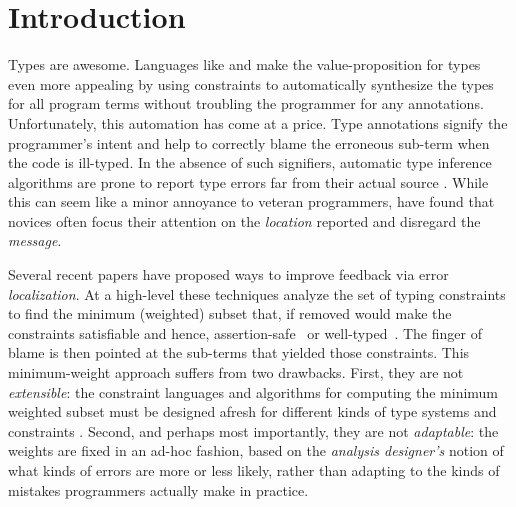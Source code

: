 \section{\textbf{Introduction}}
\label{sec:introduction}

%
Types are awesome.
%
Languages like \ocaml and \haskell make
the value-proposition for types even more
appealing by using constraints to automatically
synthesize the types for all program terms
without troubling the programmer for any
annotations.
%
Unfortunately, this automation has come at a price.
Type annotations signify
the programmer's intent and help to correctly
blame the erroneous sub-term when the code is
ill-typed.
%
In the absence of such signifiers, automatic
type inference algorithms are prone to report
type errors far from their actual source
\citep{Wand1986-nw}.
%
While this can seem like a minor annoyance to
veteran programmers, \citet{Joosten1993-yx} have found
that novices often focus their attention on the \emph{location}
reported and disregard the \emph{message}.

%
Several recent papers have proposed ways
to improve feedback via error \emph{localization}.
%
At a high-level these techniques analyze
the set of typing constraints to find
the minimum (weighted) subset that,
if removed would make the constraints
satisfiable and hence, assertion-safe~\citep{Jose:2011}
or well-typed~\citep{Zhang2014-lv,Loncaric2016-uk,Chen2014-gd,Pavlinovic2014-mr}.
The finger of blame is then pointed at the
sub-terms that yielded those constraints.
%
This minimum-weight approach suffers
from two drawbacks.
%
First, they are not \emph{extensible}:
the constraint languages and algorithms for computing
the minimum weighted subset must be
designed afresh for different kinds
of type systems and constraints \citep{Loncaric2016-uk}.
%
Second, and perhaps most importantly,
they are not \emph{adaptable}: the
weights are fixed in an ad-hoc fashion, based on the
\emph{analysis designer's} notion
of what kinds of errors are more
or less likely, rather than
adapting to the kinds of mistakes
programmers actually make in practice.

